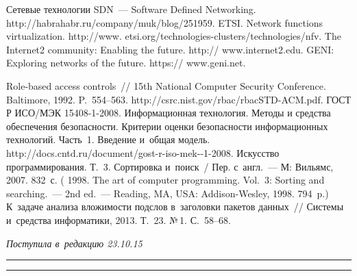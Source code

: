 \begin{multicols}{2}
{\small\frenchspacing
 {%
 \begin{thebibliography}{9}
      Сетевые технологии SDN~--- Software Defined Networking. 
{\sf http://habrahabr.ru/company/muk/blog/251959}.
    ETSI. Network functions virtualization. 
    {\sf http://www. etsi.org/technologies-clusters/technologies/nfv}.
   The Internet2 community: Enabling the future. {\sf http:// www.internet2.edu}.
 GENI: Exploring networks of the future. {\sf https:// www.geni.net}.

 Role-based access controls~// 15th National 
Computer Security Conference. Baltimore, 1992. P.~554--563.
{\sf http://csrc.nist.gov/rbac/rbacSTD-\linebreak ACM.pdf}.
ГОСТ Р ИСО/МЭК 15408-1-2008. Информационная технология. Методы 
и средства обеспечения без\-опас\-ности. Критерии оценки безопасности 
информационных технологий. Часть~1. Введение и~\mbox{общая} модель. 
{\sf http://docs.cntd.ru/document/gost-r-iso-mek--1-2008}.
 Искусство программирования. Т.~3. Сортировка и~поиск~/
Пер. с~англ.~--- М: 
Вильямс, 2007. 832~с. ( 1998. 
{The art of computer programming. Vol.~3: 
  Sorting and searching}.~--- 2nd ed.~--- Reading, MA, USA: Addison-Wesley, 1998. 794~p.)
 К~задаче анализа вложимости подслов в~заголовки 
пакетов данных~// Системы и~средства информатики, 2013. Т.~23. №\,1. С.~58--68.
 \end{thebibliography}

 }
 }

\end{multicols}

\vspace*{-6pt}

\hfill{\small\textit{Поступила в~редакцию 23.10.15}}

\vspace*{8pt}



\hrule

\vspace*{2pt}

\hrule

\vspace*{8pt}

